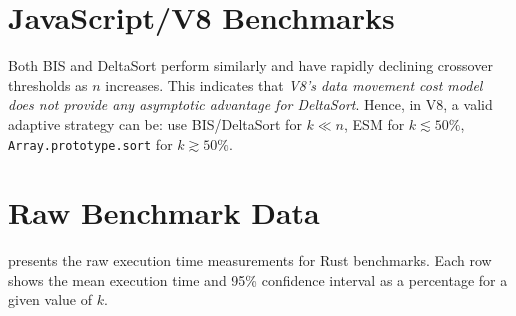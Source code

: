 \appendix

\section{JavaScript/V8 Benchmarks}
\label{sec:appendix-js-deltasort}



Both BIS and DeltaSort perform similarly and have rapidly declining crossover thresholds as $n$ increases. This indicates that \emph{V8's data movement cost model does not provide any asymptotic advantage for DeltaSort}. Hence, in V8, a valid adaptive strategy can be: use BIS/DeltaSort for $k \ll n$, ESM for $k \lesssim 50\%$, \texttt{Array.prototype.sort} for $k \gtrsim 50\%$.

\section{Raw Benchmark Data}
\label{sec:appendix-raw-data}

 presents the raw execution time measurements for Rust benchmarks. Each row shows the mean execution time and 95\% confidence interval as a percentage for a given value of $k$.

\def\csvdir{rust}
\def\csvpath{rust/execution-time.csv}
\def\csvlabel{Rust}


